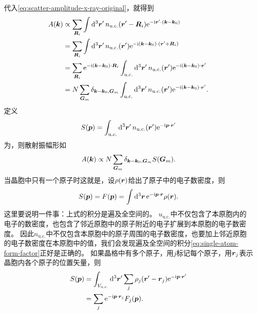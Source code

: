 代入\eqref{eq:scatter-amplitude-x-ray-original}，就得到
\[
    \begin{aligned}
        A(\vb*{k}) &\propto \sum_{\vb*{R}_i} \int \dd[3]{\vb*{r}'} n_\text{u.c.}(\vb*{r}' - \vb*{R}_i) \mathrm{e}^{-\mathrm{i} \vb*{r}' \cdot (\vb*{k} - \vb*{k}_0)} \\
        &= \sum_{\vb*{R}_i} \int \dd[3]{\vb*{r}'} n_\text{u.c.}(\vb*{r}') \mathrm{e}^{-\mathrm{i} (\vb*{k} - \vb*{k}_0) \cdot (\vb*{r}' + \vb*{R}_i)} \\
        &= \sum_{\vb*{R}_i} \mathrm{e}^{-\mathrm{i} (\vb*{k} - \vb*{k}_0) \cdot \vb*{R}_i} \int_{\text{u.c.}} \dd[3]{\vb*{r}'} n_\text{u.c.}(\vb*{r}') \mathrm{e}^{-\mathrm{i} (\vb*{k} - \vb*{k}_0) \cdot \vb*{r}'} \\
        &= N \sum_{\vb*{G}_m} \delta_{\vb*{k}-\vb*{k}_0 ,\vb*{G}_m} \int_{\text{u.c.}} \dd[3]{\vb*{r}'} n_\text{u.c.}(\vb*{r}') \mathrm{e}^{-\mathrm{i} (\vb*{k} - \vb*{k}_0) \cdot \vb*{r}'}.
    \end{aligned}
\]
定义
\begin{equation}
    S(\vb*{p}) = \int_{\text{u.c.}} \dd[3]{\vb*{r}'} n_\text{u.c.}(\vb*{r}') \mathrm{e}^{-\mathrm{i} \vb*{p} \cdot \vb*{r}'}
\end{equation}
为，则散射振幅形如
\begin{equation}
    A(\vb*{k}) \propto N \sum_{\vb*{G}_m} \delta_{\vb*{k} - \vb*{k}_0, \vb*{G}_m} S(\vb*{G}_m).
\end{equation}
当晶胞中只有一个原子时这就是，设$\rho(\vb*{r})$给出了原子中的电子数密度，则
\begin{equation}
    S(\vb*{p}) = F(\vb*{p}) = \int \dd[3]{\vb*{r}} \mathrm{e}^{-\mathrm{i} \vb*{p} \cdot \vb*{r}} \rho(\vb*{r}).
    \label{eq:single-atom-form-factor}
\end{equation}
这里要说明一件事：上式的积分是遍及全空间的。
$u_\text{u.c.}$中不仅包含了本原胞内的电子的数密度，也包含了邻近原胞中的原子附近的电子扩展到本原胞的电子数密度。
因此$n_\text{u.c.}$中不仅包含本原胞中的原子周围的电子数密度，也要加上邻近原胞的电子数密度在本原胞中的值，我们会发现遍及全空间的积分\eqref{eq:single-atom-form-factor}正好是正确的。
如果晶格中有多个原子，用$j$标记每个原子，用$\vb*{r}_j$表示晶胞内各个原子的位置矢量，则
\begin{equation}
    \begin{aligned}
        S(\vb*{p}) &= \int_{V_{\text{u.c.}}} \dd[3]{\vb*{r}'} \sum_j \rho_j(\vb*{r}' - \vb*{r}_j) \mathrm{e}^{-\mathrm{i} \vb*{p} \cdot \vb*{r}'} \\
        &= \sum_j \mathrm{e}^{-\mathrm{i} \vb*{p} \cdot \vb*{r}_j} F_j(\vb*{p}).
    \end{aligned}
\end{equation}

